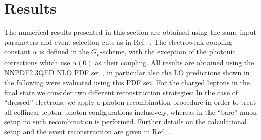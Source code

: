 \documentclass[11pt]{cernrep}
\begin{document}
\section{Results}
\label{sec:dyew:results}

The numerical results presented in this section are obtained using 
the same input parameters and event selection cuts as in 
Ref.~\cite{Dittmaier:2015rxo}. The electroweak coupling constant 
$\alpha$ is defined in the $G_\mu$-scheme, with the exception of 
the photonic corrections which use $\alpha(0)$ as their coupling. 
All results are obtained using the NNPDF2.3QED NLO PDF set 
\cite{Ball:2012cx}, in particular also the LO predictions shown in 
the following were evaluated using this PDF set. For the charged 
leptons in the final state we consider two different reconstruction 
strategies: In the case of ``dressed'' electrons, we apply a photon 
recombination procedure in order to treat all collinear 
lepton--photon configurations inclusively, whereas in the ``bare'' 
muon setup no such recombination is performed. Further details on 
the calculational setup and the event reconstruction are given in 
Ref.~\cite{Dittmaier:2015rxo}.
\end{document}
